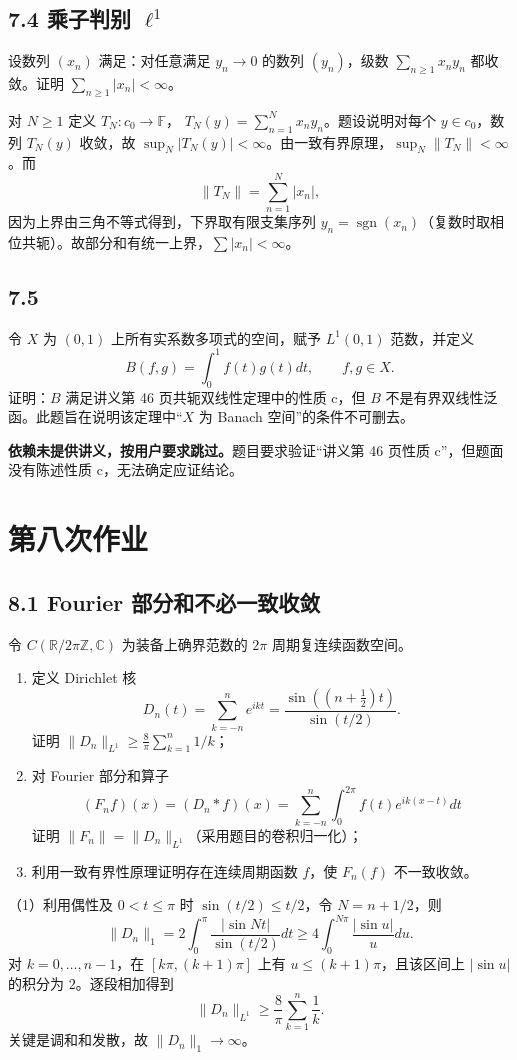 \subsection*{7.4 乘子判别 $\ell^1$}
\begin{problem}
设数列 $(x_n)$ 满足：对任意满足 $y_n\to0$ 的数列 $(y_n)$，级数
$\sum_{n\ge1}x_ny_n$ 都收敛。证明 $\sum_{n\ge1}|x_n|<\infty$。
\end{problem}
对 $N\ge1$ 定义 $T_N:c_0\to\mathbb F$，
$T_N(y)=\sum_{n=1}^Nx_ny_n$。题设说明对每个 $y\in c_0$，数列 $T_N(y)$ 收敛，故
$\sup_N|T_N(y)|<\infty$。由一致有界原理，$\sup_N\|T_N\|<\infty$。而
\[
\|T_N\|=\sum_{n=1}^N|x_n|,
\]
因为上界由三角不等式得到，下界取有限支集序列 $y_n=\operatorname{sgn}(x_n)$（复数时取相位共轭）。故部分和有统一上界，$\sum|x_n|<\infty$。

\subsection*{7.5}
\begin{problem}
令 $X$ 为 $(0,1)$ 上所有实系数多项式的空间，赋予 $L^1(0,1)$ 范数，并定义
\[
B(f,g)=\int_0^1f(t)g(t)dt,\qquad f,g\in X.
\]
证明：$B$ 满足讲义第 46 页共轭双线性定理中的性质 c，但 $B$ 不是有界双线性泛函。此题旨在说明该定理中“$X$ 为 Banach 空间”的条件不可删去。
\end{problem}
\textbf{依赖未提供讲义，按用户要求跳过。}题目要求验证“讲义第 46 页性质 c”，但题面没有陈述性质 c，无法确定应证结论。

\section{第八次作业}

\subsection*{8.1 Fourier 部分和不必一致收敛}
\begin{problem}
令 $C(\mathbb R/2\pi\mathbb Z,\mathbb C)$ 为装备上确界范数的 $2\pi$ 周期复连续函数空间。
\begin{enumerate}[label=(\arabic*)]
\item 定义 Dirichlet 核
\[
D_n(t)=\sum_{k=-n}^ne^{ikt}
=\frac{\sin((n+\tfrac12)t)}{\sin(t/2)}.
\]
证明 $\|D_n\|_{L^1}\ge\frac8\pi\sum_{k=1}^n1/k$；
\item 对 Fourier 部分和算子
\[
(F_nf)(x)=(D_n*f)(x)
=\sum_{k=-n}^n\int_0^{2\pi}f(t)e^{ik(x-t)}dt
\]
证明 $\|F_n\|=\|D_n\|_{L^1}$（采用题目的卷积归一化）；
\item 利用一致有界性原理证明存在连续周期函数 $f$，使 $F_n(f)$ 不一致收敛。
\end{enumerate}
\end{problem}
（1）利用偶性及 $0<t\le\pi$ 时 $\sin(t/2)\le t/2$，令 $N=n+1/2$，则
\[
\|D_n\|_1
=2\int_0^\pi\frac{|\sin Nt|}{\sin(t/2)}dt
\ge4\int_0^{N\pi}\frac{|\sin u|}{u}du.
\]
对 $k=0,\ldots,n-1$，在 $[k\pi,(k+1)\pi]$ 上有 $u\le(k+1)\pi$，且该区间上 $|\sin u|$ 的积分为 $2$。逐段相加得到
\[
\|D_n\|_{L^1}\ge\frac8\pi\sum_{k=1}^n\frac1k.
\]
关键是调和和发散，故 $\|D_n\|_1\to\infty$。

